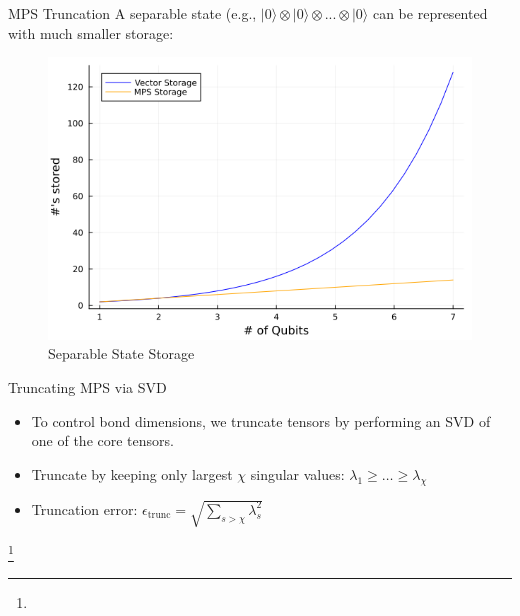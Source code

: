 \documentclass{beamer}
\newcommand\blfootnote[1]{%
  \begingroup
  \renewcommand\thefootnote{}\footnote{#1}%
  \addtocounter{footnote}{-1}%
  \endgroup
}
\begin{document}
\begin{frame}{MPS Truncation}
    \small
    A separable state (e.g., $|0\rangle \otimes |0\rangle \otimes ...\otimes |0\rangle$ can be represented with much smaller storage:

    \vspace{0.5em}
    \begin{figure}
        \centering
        \includegraphics[width=0.8\linewidth]{images/Misc/total_scale.png}
        \caption{Separable State Storage}
        \label{fig:Total_Scale}
    \end{figure}

\end{frame}


\begin{frame}{Truncating MPS via SVD}
  \begin{itemize}
    \item To control bond dimensions, we truncate tensors by performing an SVD of one of the core tensors.
  \end{itemize}



  \vspace{0.5em}
  \begin{itemize}
    \item Truncate by keeping only largest $\chi$ singular values: $\lambda_1 \geq \dots \geq \lambda_\chi$
    \item Truncation error: $\epsilon_{\text{trunc}} = \sqrt{\sum_{s>\chi} \lambda_s^2}$
  \end{itemize}
  \blfootnote{}
\end{frame}
\end{document}
